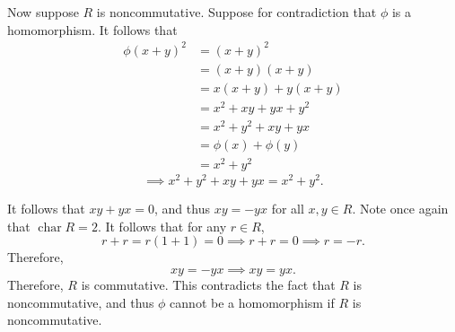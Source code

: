\documentclass[11pt, letterpaper]{article}
\begin{document}
Now suppose $R$ is noncommutative. Suppose for contradiction that $\phi $ is a homomorphism. It follows that
\begin{align*}
	\phi (x+y)^2&=(x+y)^2\\
		    &=(x+y)(x+y)\\
		    &=x(x+y)+y(x+y)\\
		    &=x^2+xy+yx+y^2\\
		    &=x^2+y^2+xy+yx\\
		    &=\phi (x)+\phi (y)\\
		    &=x^2+y^2
\end{align*}
\[
	\implies x^2+y^2+xy+yx=x^2+y^2
.\]

It follows that $xy+yx=0$, and thus $xy=-yx$ for all $x,y\in R$. Note once again that $\operatorname{char} R=2$. It follows that for any $r\in R$,
\[
	r+r=r(1+1)=0\implies r+r=0\implies r=-r
.\]
Therefore,
\[
	xy=-yx \implies xy=yx
.\]
Therefore, $R$ is commutative. This contradicts the fact that $R$ is noncommutative, and thus $\phi $ cannot be a homomorphism if $R$ is noncommutative.
\end{document}
